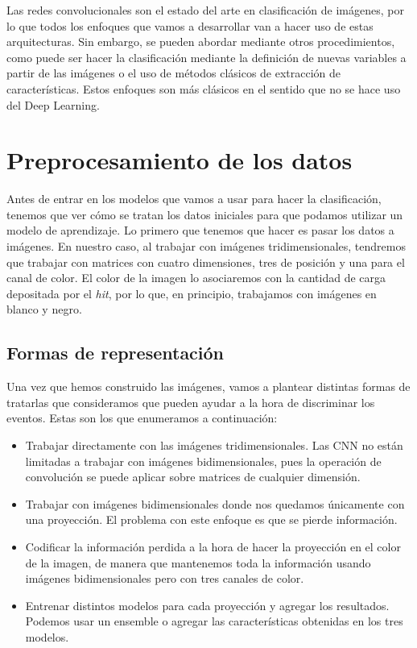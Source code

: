 \documentclass[a4paper,12pt,oneside,titlepage]{book}
\begin{document}
Las redes convolucionales son el estado del arte en clasificación de imágenes, por lo que todos los enfoques que vamos a desarrollar van a hacer uso de estas arquitecturas. Sin embargo, se pueden abordar mediante otros procedimientos, como puede ser hacer la clasificación mediante la definición de nuevas variables a partir de las imágenes o el uso de métodos clásicos de extracción de características. Estos enfoques son más clásicos en el sentido que no se hace uso del Deep Learning.

\section{Preprocesamiento de los datos}
\label{sec:des_trat}

Antes de entrar en los modelos que vamos a usar para hacer la clasificación, tenemos que ver cómo se tratan los datos iniciales para que podamos utilizar un modelo de aprendizaje. Lo primero que tenemos que hacer es pasar los datos a imágenes. En nuestro caso, al trabajar con imágenes tridimensionales, tendremos que trabajar con matrices con cuatro dimensiones, tres de posición y una para el canal de color. El color de la imagen lo asociaremos con la cantidad de carga depositada por el \textit{hit}, por lo que, en principio, trabajamos con imágenes en blanco y negro.

\subsection{Formas de representación}

Una vez que hemos construido las imágenes, vamos a plantear distintas formas de tratarlas que consideramos que pueden ayudar a la hora de discriminar los eventos. Estas son los que enumeramos a continuación:

\begin{itemize}
  \item Trabajar directamente con las imágenes tridimensionales. Las CNN no están limitadas a trabajar con imágenes bidimensionales, pues la operación de convolución se puede aplicar sobre matrices de cualquier dimensión.
  \item Trabajar con imágenes bidimensionales donde nos quedamos únicamente con una proyección. El problema con este enfoque es que se pierde información.
  \item Codificar la información perdida a la hora de hacer la proyección en el color de la imagen, de manera que mantenemos toda la información usando imágenes bidimensionales pero con tres canales de color.
  \item Entrenar distintos modelos para cada proyección y agregar los resultados. Podemos usar un ensemble o agregar las características obtenidas en los tres modelos.
\end{itemize}
\end{document}

